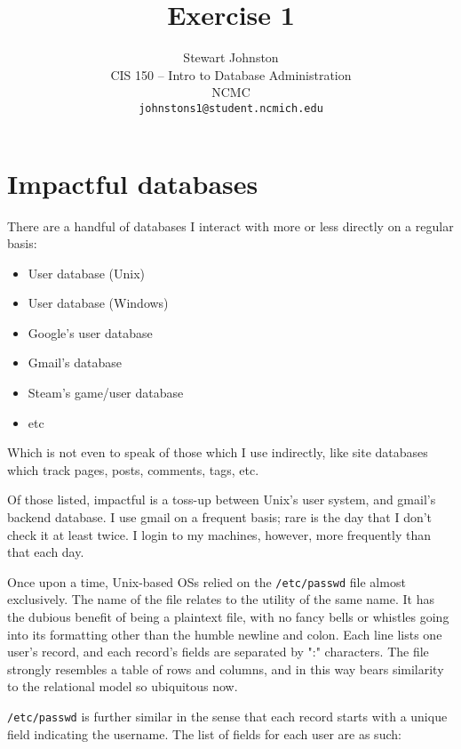 \documentclass{article}
\title{Exercise 1}
\author{Stewart Johnston\\
  {CIS 150 -- Intro to Database Administration}\\
  {NCMC}\\
  {\texttt{johnstons1@student.ncmich.edu}}
}
\date
\begin{document}
\maketitle

\section{Impactful databases}

There are a handful of databases I interact with more or less directly on a regular basis:

\begin{itemize}
	\item User database (Unix)
	\item User database (Windows)
	\item Google's user database
	\item Gmail's database
	\item Steam's game/user database
	\item etc
\end{itemize}

Which is not even to speak of those which I use indirectly, like site databases
which track pages, posts, comments, tags, etc.

Of those listed, impactful is a toss-up between Unix's user system, and gmail's
backend database. I use gmail on a frequent basis; rare is the day that I don't
check it at least twice. I login to my machines, however, more frequently than
that each day.

Once upon a time, Unix-based OSs relied on the \verb|/etc/passwd| file almost
exclusively. The name of the file relates to the utility of the same name. It
has the dubious benefit of being a plaintext file, with no fancy bells or
whistles going into its formatting other than the humble newline and colon.
Each line lists one user's record, and each record's fields are separated by
":" characters. The file strongly resembles a table of rows and columns, and in
this way bears similarity to the relational model so ubiquitous now.

\verb|/etc/passwd| is further similar in the sense that each record starts with
a unique field indicating the username. The list of fields for each user are as
such:
\end{document}
